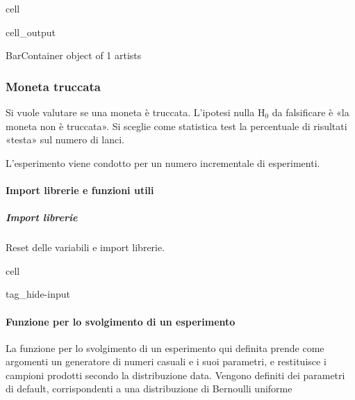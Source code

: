 \documentclass[letterpaper,10pt,italian]{jupyterBook}
\begin{document}
\begin{sphinxuseclass}{cell}
\begin{sphinxVerbatimOutput}
\begin{sphinxuseclass}{cell_output}
\begin{sphinxVerbatim}[commandchars=\\\{\}]
\PYGZlt{}BarContainer object of 1 artists\PYGZgt{}
\end{sphinxVerbatim}

\noindent{}

\end{sphinxuseclass}\end{sphinxVerbatimOutput}

\end{sphinxuseclass}
\sphinxstepscope


\subsubsection{Moneta truccata}
\label{\detokenize{ch/statistics/test-fisher-coin-2:moneta-truccata}}\label{\detokenize{ch/statistics/test-fisher-coin-2::doc}}
\sphinxAtStartPar
Si vuole valutare se una moneta è truccata. L’ipotesi nulla \(\text{H}_0\) da falsificare è «la moneta non è truccata». Si sceglie come statistica test la percentuale di risultati «testa» sul numero di lanci.

\sphinxAtStartPar
L’esperimento viene condotto per un numero incrementale di esperimenti.


\paragraph{Import librerie e funzioni utili}
\label{\detokenize{ch/statistics/test-fisher-coin-2:import-librerie-e-funzioni-utili}}

\subparagraph{Import librerie}
\label{\detokenize{ch/statistics/test-fisher-coin-2:import-librerie}}
\sphinxAtStartPar
Reset delle variabili e import librerie.

\begin{sphinxuseclass}{cell}
\begin{sphinxuseclass}{tag_hide-input}
\end{sphinxuseclass}
\end{sphinxuseclass}

\paragraph{Funzione per lo svolgimento di un esperimento}
\label{\detokenize{ch/statistics/test-fisher-coin-2:funzione-per-lo-svolgimento-di-un-esperimento}}
\sphinxAtStartPar
La funzione per lo svolgimento di un esperimento qui definita prende come argomenti un generatore di numeri casuali e i suoi parametri, e restituisce i campioni prodotti secondo la distribuzione data. Vengono definiti dei parametri di default, corrispondenti a una distribuzione di Bernoulli uniforme
\end{document}
